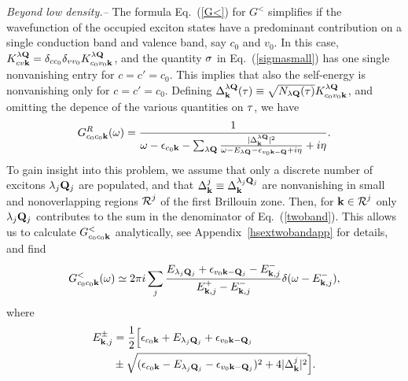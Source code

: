 \documentclass[twocolumn,aps,a4paper,superscriptaddress]{revtex4-2}
\begin{document}
{\em Beyond low density.--}
The formula Eq.~(\ref{G<}) for $G^{<}$  simplifies if the wavefunction
of the occupied exciton states
have a predominant contribution on a single conduction
band and valence band, say $c_{0}$ and $v_{0}$. In this case,
$K^{\lambda{\mathbf Q}}_{cv{\mathbf k}}=\delta_{cc_{0}}\delta_{vv_{0}}K^{\lambda{\mathbf Q}}_{c_{0}v_{0}{\mathbf k}}$,
and the quantity $\sigma$ in Eq.~(\ref{sigmasmall}) has one single
nonvanishing entry for $c=c'=c_{0}$. This implies that also the
self-energy is nonvanishing only for $c=c'=c_{0}$. Defining
$\Delta_{{\mathbf k}}^{\lambda{\mathbf Q}}(\tau)\equiv
\sqrt{N_{\lambda{\mathbf Q}}(\tau)}K_{c_{0}v_{0}{\mathbf k}}^{\lambda{\mathbf Q}}$, and omitting the
depence of the various quantities on $\tau$, we have
\begin{align}
G^{R}_{c_{0}c_{0}{\mathbf k}}(\omega)=\frac{1}{\omega-\epsilon_{c_{0}{\mathbf k}}-
\sum_{\lambda{\mathbf Q}}
\frac{|\Delta_{{\mathbf k}}^{\lambda{\mathbf Q}}|^{2}}{\omega-E_{\lambda{\mathbf Q}}-\epsilon_{v_{0}{\mathbf k}-{\mathbf Q}}+i\eta}+i\eta}.
\label{twoband}
\end{align}
To gain insight into this problem,  we assume that
only a discrete number of excitons $\lambda_{j}{\mathbf Q}_{j}$ are populated,
and that $ \Delta_{{\mathbf k}}^{j}\equiv \Delta_{{\mathbf k}}^{\lambda_{j}{\mathbf Q}_{j}}$ are nonvanishing in small and
nonoverlapping regions $\mbox{$\mathcal{R}$}^{j}$
of the first Brillouin zone. Then, for  ${\mathbf k}\in \mbox{$\mathcal{R}$}^{j}$ only
$\lambda_{j}{\mathbf Q}_{j}$ contributes to the sum in the denominator of
Eq.~(\ref{twoband}). This allows us to calculate
$G^{<}_{c_{0}c_{0}{\mathbf k}}$ analytically, see Appendix~\ref{hsextwobandapp} for details, and
find
\begin{align}
G^{<}_{c_{0}c_{0}{\mathbf k}}(\omega)\simeq 2\pi i  \sum_{j}
\frac{E_{\lambda_{j}{\mathbf Q}_{j}}+\epsilon_{v_{0}{\mathbf k}-{\mathbf Q}_{j}}-E_{{\mathbf k},j}^{-}}
{E_{{\mathbf k},j}^{+}-E_{{\mathbf k},j}^{-}}\delta(\omega-E_{{\mathbf k},j}^{-}),
\label{G<i2}
\end{align}
where
\begin{align}
E_{{\mathbf k},j}^{\pm}&=\frac{1}{2}
\Big[\epsilon_{c_{0}{\mathbf k}}+E_{\lambda_{j}{\mathbf Q}_{j}}+\epsilon_{v_{0}{\mathbf k}-{\mathbf Q}_{j}}
\nonumber\\
&\pm\sqrt{(\epsilon_{c_{0}{\mathbf k}}-E_{\lambda_{j}{\mathbf Q}_{j}}
-\epsilon_{v_{0}{\mathbf k}-{\mathbf Q}_{j}})^{2}+4|\Delta_{{\mathbf k}}^{j}|^{2}}\Big].
\label{epm}
\end{align}
\end{document}
